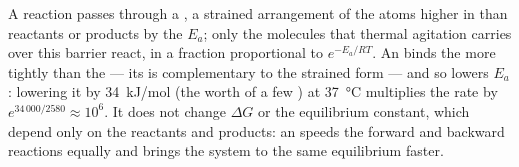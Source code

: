\begin{proposition}\label{prop:b1:enzymes:whatitdoes}
A reaction passes through a \emph{}, a strained
arrangement of the atoms higher in  than reactants or
products by the \emph{} $E_a$; only the molecules
that thermal agitation carries over this barrier react, in a fraction
proportional to $e^{-E_a/RT}$. An  binds the 
more tightly than the  --- its  is complementary
to the strained form --- and so lowers $E_a$: lowering it by
\qty{34}{kJ/mol} (the worth of a few ) at
\qty{37}{\celsius} multiplies the rate by $e^{34\,000/2580} \approx
10^6$. It does not change $\Delta G$ or the equilibrium constant, which
depend only on the reactants and products: an  speeds the
forward and backward reactions equally and brings the system to the
same equilibrium faster.
\end{proposition}

